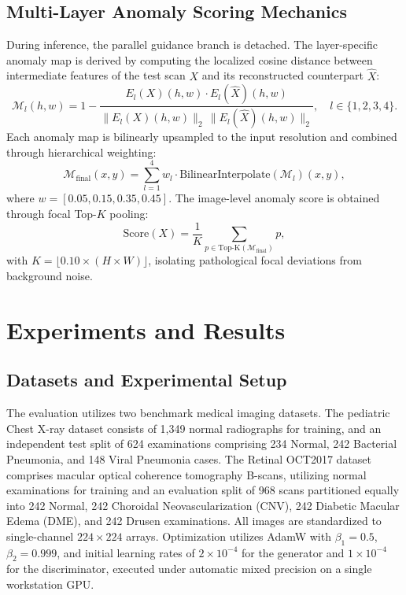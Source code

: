 \documentclass[journal]{IEEEtran}
\begin{document}
\subsection{Multi-Layer Anomaly Scoring Mechanics}
During inference, the parallel guidance branch is detached. The layer-specific anomaly map is derived by computing the localized cosine distance between intermediate features of the test scan $X$ and its reconstructed counterpart $\hat{X}$:
\begin{equation}
\mathcal{M}_l(h, w) = 1 - \frac{E_l(X)(h, w) \cdot E_l(\hat{X})(h, w)}{\|E_l(X)(h, w)\|_2 \, \|E_l(\hat{X})(h, w)\|_2}, \quad l \in \{1, 2, 3, 4\}.
\end{equation}
Each anomaly map is bilinearly upsampled to the input resolution and combined through hierarchical weighting:
\begin{equation}
\mathcal{M}_{\text{final}}(x, y) = \sum_{l=1}^4 w_l \cdot \text{BilinearInterpolate}\left(\mathcal{M}_l\right)(x, y),
\end{equation}
where $w = [0.05, 0.15, 0.35, 0.45]$. The image-level anomaly score is obtained through focal Top-$K$ pooling:
\begin{equation}
\text{Score}(X) = \frac{1}{K} \sum_{p \in \text{Top-K}(\mathcal{M}_{\text{final}})} p,
\end{equation}
with $K = \lfloor 0.10 \times (H \times W) \rfloor$, isolating pathological focal deviations from background noise.

\section{Experiments and Results}

\subsection{Datasets and Experimental Setup}
The evaluation utilizes two benchmark medical imaging datasets. The pediatric Chest X-ray dataset consists of 1,349 normal radiographs for training, and an independent test split of 624 examinations comprising 234 Normal, 242 Bacterial Pneumonia, and 148 Viral Pneumonia cases. The Retinal OCT2017 dataset comprises macular optical coherence tomography B-scans, utilizing normal examinations for training and an evaluation split of 968 scans partitioned equally into 242 Normal, 242 Choroidal Neovascularization (CNV), 242 Diabetic Macular Edema (DME), and 242 Drusen examinations. All images are standardized to single-channel $224 \times 224$ arrays. Optimization utilizes AdamW with $\beta_1 = 0.5$, $\beta_2 = 0.999$, and initial learning rates of $2 \times 10^{-4}$ for the generator and $1 \times 10^{-4}$ for the discriminator, executed under automatic mixed precision on a single workstation GPU.
\end{document}
